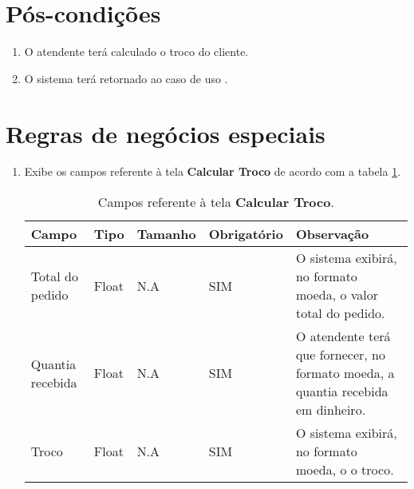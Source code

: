 \section{Pós-condições}

\begin{enumerate}
	\item O atendente terá calculado o troco do cliente.
	\item O sistema terá retornado ao caso de uso .	
\end{enumerate}

\section{Regras de negócios especiais}

\begin{enumerate}[label=RN\arabic*]
	\item Exibe os campos referente à tela \textbf{Calcular Troco} de acordo com a tabela \ref{uc008_tb_rn1}. \label{uc008_rn:1}
	\begin{table}[htb]
		\ABNTEXfontereduzida
		\caption[Campos referente à tela \textbf{Calcular Troco}]{Campos referente à tela \textbf{Calcular Troco}.}
		\label{uc008_tb_rn1}
		\begin{tabular}{|p{3.0cm}|p{2.0cm}|p{1.5cm}|p{2.0cm}|p{5.75cm}|}
			\hline
			\textbf{Campo}   & \textbf{Tipo} & \textbf{Tamanho} & \textbf{Obrigatório} & \textbf{Observação}                                                              \\ \hline
			Total do pedido  & Float         & N.A              & SIM                  & O sistema exibirá, no formato moeda, o valor total do pedido.                    \\ \hline
			Quantia recebida & Float         & N.A              & SIM                  & O atendente terá que fornecer, no formato moeda, a quantia recebida em dinheiro. \\ \hline
			Troco            & Float         & N.A              & SIM                  & O sistema exibirá, no formato moeda, o o troco.                                  \\ \hline
		\end{tabular}
	\end{table}
\end{enumerate}